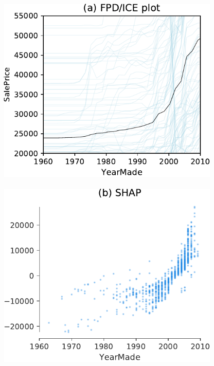 \documentclass[]{article} %
\newcommand{\cut}[1]{}
\begin{document}
\cut{
pregnant female at max range [233.33467678]
pregnant female in male height range [228.71359869]
nonpregnant female in male height range [209.88006493]
male in male height range [219.46772083]
}


\cut{
$1/n*\sum_{i=1}^n f(x_j = pregnant, x_{i, \bar{j}}) - f(x_j = not pregnant, x_{i, \bar{j}})$

\noindent where ${x_{i, \bar{j}}: i=1,2,?,n}$ are the n training observations of $x_{\bar{j}}$
}

\begin{figure}[!htbp]
\begin{center}
\includegraphics[scale=0.28]{images/bulldozer_YearMade_pdp.pdf}~~
\includegraphics[scale=0.29]{images/bulldozer_YearMade_shap.pdf}~~

\end{center}
\end{figure}
\end{document}
